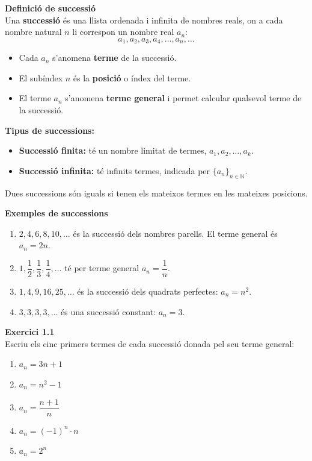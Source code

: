 \documentclass[12pt]{article}
\begin{document}
\begin{concept}
\textbf{Definició de successió}\\
Una \textbf{successió} és una llista ordenada i infinita de nombres reals, on a cada nombre natural $n$ li correspon un nombre real $a_n$:
\[
a_1, a_2, a_3, a_4, \dots, a_n, \dots
\]
\begin{itemize}
    \item Cada $a_n$ s'anomena \textbf{terme} de la successió.
    \item El subíndex $n$ és la \textbf{posició} o índex del terme.
    \item El terme $a_n$ s'anomena \textbf{terme general} i permet calcular qualsevol terme de la successió.
\end{itemize}

\textbf{Tipus de successions:}
\begin{itemize}
    \item \textbf{Successió finita:} té un nombre limitat de termes, $a_1, a_2, \dots, a_k$.
    \item \textbf{Successió infinita:} té infinits termes, indicada per $\{a_n\}_{n \in \mathbb{N}}$.
\end{itemize}

Dues successions són iguals si tenen els mateixos termes en les mateixes posicions.
\end{concept}

\begin{exemple}
\textbf{Exemples de successions}
\begin{enumerate}[label=\alph*)]
    \item $2, 4, 6, 8, 10, \dots$ és la successió dels nombres parells. El terme general és $a_n = 2n$.
    \item $1, \dfrac{1}{2}, \dfrac{1}{3}, \dfrac{1}{4}, \dots$ té per terme general $a_n = \dfrac{1}{n}$.
    \item $1, 4, 9, 16, 25, \dots$ és la successió dels quadrats perfectes: $a_n = n^2$.
    \item $3, 3, 3, 3, \dots$ és una successió constant: $a_n = 3$.
\end{enumerate}
\end{exemple}

\begin{exercici}
\textbf{Exercici 1.1}\\
Escriu els cinc primers termes de cada successió donada pel seu terme general:
\begin{enumerate}[label=\alph*)]
    \item $a_n = 3n + 1$
    \item $a_n = n^2 - 1$
    \item $a_n = \dfrac{n+1}{n}$
    \item $a_n = (-1)^n \cdot n$
    \item $a_n = 2^n$
\end{enumerate}
\end{exercici}
\end{document}
